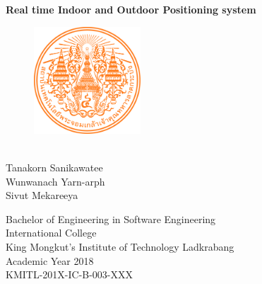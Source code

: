 \begin{center}
	\vspace{12pt}
	\begin{LARGE}
		\textbf{Real time Indoor and Outdoor Positioning system}
	\end{LARGE}
	\vspace{60pt}
	\begin{figure}[h]
		\centering
		\includegraphics[height = 4cm, width =4cm]{Image/kmitl.png}
	\end{figure}
	\vspace{84pt}
	\begin{Large}
		\\Tanakorn Sanikawatee\\
		Wunwanach Yarn-arph\\
		Sivut Mekareeya\\
	\end{Large}
	\vspace{96pt}
	\begin{Large}
		Bachelor of Engineering in Software Engineering\\
		International College\\
		King Mongkut's Institute of Technology Ladkrabang\\
		Academic Year 2018\\
        		KMITL-201X-IC-B-003-XXX\\
	\end{Large}
	\vspace{12pt}
\thispagestyle{empty}
\end{center}
